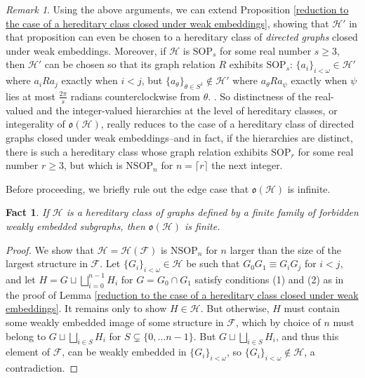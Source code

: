 \documentclass{amsart}
\newtheorem{fact}[theorem]{Fact}
\theoremstyle{definition}
\theoremstyle{remark}
\newtheorem{remark}[theorem]{Remark}
\numberwithin{equation}{section}
\begin{document}
\begin{remark}\label{reduction to directed graphs}
    Using the above arguments, we can extend Proposition \ref{reduction to the case of a hereditary class closed under weak embeddings}, showing that $\mathcal{H}'$ in that proposition can even be chosen to a hereditary class of \textit{directed graphs} closed under weak embeddings. Moreover, if $\mathcal{H}$ is $\mathrm{SOP}_{s}$ for some real number $s \geq 3$, then $\mathcal{H}'$ can be chosen so that its graph relation $R$ exhibits $\mathrm{SOP}_{s}$: $\{a_{i}\}_{i < \omega} \in \mathcal{H}'$ where $a_{i} R a_{j}$ exactly when $i < j$, but $\{a_{\theta}\}_{\theta \in S^{1}} \notin \mathcal{H}'$ where $a_{\theta} R a_{\psi}$ exactly when $\psi$ lies at most $\frac{2\pi}{s}$ radians counterclockwise from $\theta$. . So distinctness of the real-valued and the integer-valued hierarchies at the level of hereditary classes, or integerality of $\mathfrak{o}(\mathcal{H})$, really reduces to the case of a hereditary class of directed graphs closed under weak embeddings--and in fact, if the hierarchies are distinct, there is such a hereditary class whose graph relation exhibits $\mathrm{SOP}_{r}$ for some real number $r \geq 3$, but which is $\mathrm{NSOP}_{n}$ for $n = \lceil r \rceil$ the next integer.
\end{remark}

Before proceeding, we briefly rule out the edge case that $\mathfrak{o}(\mathcal{H})$ is infinite.

\begin{fact}
    If $\mathcal{H}$ is a hereditary class of graphs defined by a finite family of forbidden weakly embedded subgraphs, then $\mathfrak{o}(\mathcal{H})$ is finite.
\end{fact}

\begin{proof}
    We show that $\mathcal{H}=\mathcal{H}(\mathcal{F})$ is $\mathrm{NSOP}_{n}$ for $n$ larger than the size of the largest structure in $\mathcal{F}$. Let $\{G_{i}\}_{i < \omega} \in \mathcal{H}$ be such that $G_{0}G_{1} \equiv G_{i}G_{j}$ for $i < j$, and let $H= G \sqcup \bigsqcup^{n-1}_{i=0} H_{i}$  for $G = G_{0} \cap G_{1}$ satisfy conditions (1) and (2) as in the proof of Lemma \ref{reduction to the case of a hereditary class closed under weak embeddings}. It remains only to show $H \in \mathcal{H}$. But otherwise, $H$ must contain some weakly embedded image of some structure in $\mathcal{F}$, which by choice of $n$ must belong to $ G \sqcup \bigsqcup_{i \in S} H_{i}$ for $S \subsetneq \{0, \ldots n-1\}$. But $ G \sqcup \bigsqcup_{i \in S} H_{i}$, and thus this element of $\mathcal{F}$, can be weakly embedded in $\{G_{i}\}_{i < \omega}$, so $\{G_{i}\}_{i < \omega} \notin \mathcal{H}$, a contradiction.
\end{proof}
\end{document}
